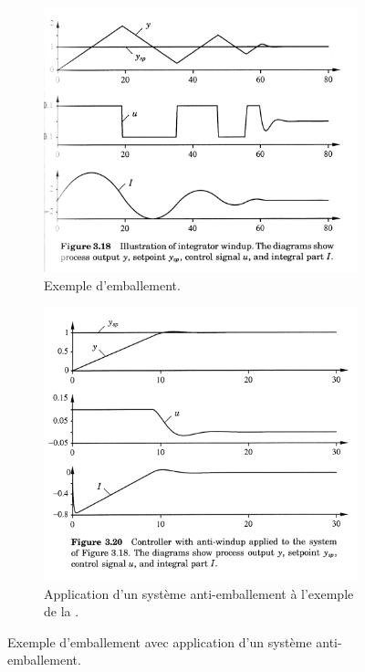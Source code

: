 \begin{figure}
  \centering
  \begin{subfigure}{0.49\linewidth}
    \includegraphics[width=\linewidth]{windup.png}
    \caption{Exemple d'emballement.}
    \label{fig:windup}
  \end{subfigure}
  \begin{subfigure}{0.49\linewidth}
    \includegraphics[width=\linewidth]{anti-windup.png}
    \caption{Application d'un système anti-emballement à l'exemple de la .}
    \label{fig:anti-windup}
  \end{subfigure}
  \caption{Exemple d'emballement avec application d'un système anti-emballement.}
  \label{fig:windup-cm}
\end{figure}

